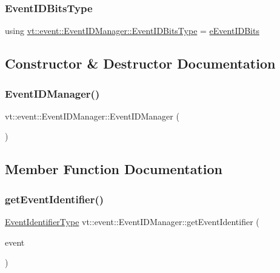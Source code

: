 \subsubsection{\texorpdfstring{Event\+I\+D\+Bits\+Type}{EventIDBitsType}}
{\footnotesize\ttfamily using \hyperlink{namespacevt_1_1event_ad563011dc9e3e01042df27d00092aceb}{vt\+::event\+::\+Event\+I\+D\+Manager\+::\+Event\+I\+D\+Bits\+Type} =  \hyperlink{namespacevt_1_1event_ad563011dc9e3e01042df27d00092aceb}{e\+Event\+I\+D\+Bits}}



\subsection{Constructor \& Destructor Documentation}
\mbox{\label{structvt_1_1event_1_1_event_i_d_manager_abbd9a6951ee83b42bd24a8399952b721}} 
\subsubsection{\texorpdfstring{Event\+I\+D\+Manager()}{EventIDManager()}}
{\footnotesize\ttfamily vt\+::event\+::\+Event\+I\+D\+Manager\+::\+Event\+I\+D\+Manager (\begin{DoxyParamCaption}{ }\end{DoxyParamCaption})\hspace{0.3cm}{\ttfamily [default]}}



\subsection{Member Function Documentation}
\mbox{\label{structvt_1_1event_1_1_event_i_d_manager_aef4daeddf6cf14ab9745bba44f820789}} 
\subsubsection{\texorpdfstring{get\+Event\+Identifier()}{getEventIdentifier()}}
{\footnotesize\ttfamily \hyperlink{namespacevt_1_1event_a0893245b7a220f3fe6951382e3038afa}{Event\+Identifier\+Type} vt\+::event\+::\+Event\+I\+D\+Manager\+::get\+Event\+Identifier (\begin{DoxyParamCaption}\item[{\hyperlink{namespacevt_a009267401def7ae8bf201892222d060f}{Event\+Type} const \&}]{event }\end{DoxyParamCaption})\hspace{0.3cm}{\ttfamily [static]}}

